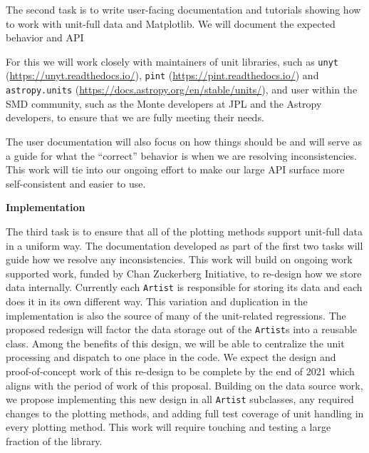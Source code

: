 \documentclass[12pt]{article}
\numberwithin{page}{section}
\begin{document}


The second task is to write user-facing documentation and tutorials
showing how to work with unit-full data and Matplotlib.  We will document
the expected behavior and API


For this we will work
closely with maintainers of unit libraries, such as \texttt{unyt}
(\url{https://unyt.readthedocs.io/}), \texttt{pint}
(\url{https://pint.readthedocs.io/}) and
\texttt{astropy.units} (\url{https://docs.astropy.org/en/stable/units/}),
and user within the SMD community, such as the Monte developers at JPL
and the Astropy developers, to ensure that we are fully meeting their
needs.

The user documentation will also focus on how things should be
and will serve as a guide for what the ``correct'' behavior is when we
are resolving inconsistencies.  This work will tie into our ongoing
effort to make our large API surface more self-consistent and easier
to use.

\textbf{Implementation}

The third task is to ensure that all of the plotting methods support
unit-full data in a uniform way.  The documentation developed as part
of the first two tasks will guide how we resolve any inconsistencies.
This work will build on ongoing work supported work, funded by Chan
Zuckerberg Initiative, to re-design how we store data internally.
Currently each \texttt{Artist} is responsible for storing its data and
each does it in its own different way.  This variation and duplication
in the implementation is also the source of many of the unit-related
regressions.  The proposed redesign will factor the data storage out
of the \texttt{Artist}s into a reusable class.  Among the benefits of
this design, we will be able to centralize the unit processing and
dispatch to one place in the code.  We expect the design and
proof-of-concept work of this re-design to be complete by the end of
2021 which aligns with the period of work of this proposal.  Building
on the data source work, we propose implementing this new design in
all \texttt{Artist} subclasses, any required changes to the plotting
methods, and adding full test coverage of unit handling in every
plotting method.  This work will require touching and testing a large
fraction of the library.
\end{document}
